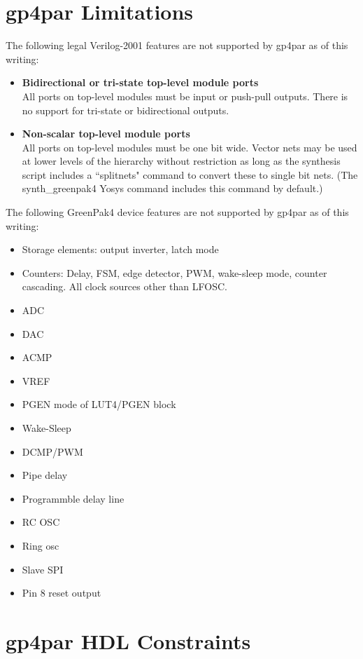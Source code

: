 \documentclass{article}
\begin{document}
\pagebreak
\section{gp4par Limitations}

The following legal Verilog-2001 features are not supported by gp4par as of this writing:

\begin{itemize}
\item {\bfseries Bidirectional or tri-state top-level module ports}\\All ports on top-level modules must be input or 
push-pull outputs. There is no support for tri-state or bidirectional outputs.
\item {\bfseries Non-scalar top-level module ports}\\All ports on top-level modules must be one bit wide. Vector nets 
may be used at lower levels of the hierarchy without restriction as long as the synthesis script includes a
``splitnets" command to convert these to single bit nets. (The synth\_greenpak4 Yosys command includes this command by 
default.)
\end{itemize}

The following GreenPak4 device features are not supported by gp4par as of this writing:

\begin{itemize}
\item Storage elements: output inverter, latch mode
\item Counters: Delay, FSM, edge detector, PWM, wake-sleep mode, counter cascading. All clock sources other than LFOSC.
\item ADC
\item DAC
\item ACMP
\item VREF
\item PGEN mode of LUT4/PGEN block
\item Wake-Sleep
\item DCMP/PWM
\item Pipe delay
\item Programmble delay line
\item RC OSC
\item Ring osc
\item Slave SPI
\item Pin 8 reset output
\end{itemize}

\pagebreak
\section{gp4par HDL Constraints}
\end{document}
